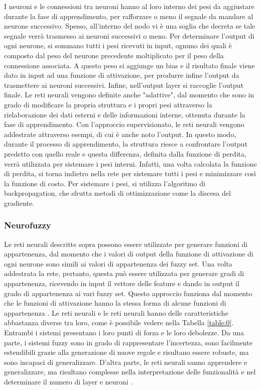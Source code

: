 \documentclass[11pt]{article}
\begin{document}
I neuroni e le connessioni tra neuroni hanno al loro interno dei pesi da aggiustare durante la fase di apprendimento, per rafforzare o meno il segnale da mandare al neurone successivo. Spesso, all'interno del nodo vi è una soglia che decreta se tale segnale verrà trasmesso ai neuroni successivi o meno. Per determinare l'output di ogni neurone, si sommano tutti i pesi ricevuti in input, ognuno dei quali è composto dal peso del neurone precedente moltiplicato per il peso della connessione associata. A questo peso si aggiunge un bias e il risultato finale viene dato in input ad una funzione di attivazione, per produrre infine l'output da trasmettere ai neuroni successivi. Infine, nell'output layer si raccoglie l'output finale. 
Le reti neurali vengono definite anche "adattive", dal momento che sono in grado di modificare la propria struttura e i propri pesi attraverso la rielaborazione dei dati esterni e delle informazioni interne, ottenuta durante la fase di apprendimento. Con l'approccio supervisionato, le reti neurali vengono addestrate attraverso esempi, di cui è anche noto l'output. In questo modo, durante il processo di apprendimento, la struttura riesce a confrontare l'output predetto con quello reale e questa differenza, definita dalla funzione di perdita, verrà utilizzata per sistemare i pesi interni. Infatti, una volta calcolata la funzione di perdita, si torna indietro nella rete per sistemare tutti i pesi e minimizzare così la funzione di costo. Per sistemare i pesi, si utilizza l'algoritmo di backpropagation, che sfrutta metodi di ottimizzazione come la discesa del gradiente. 



\subsubsection{Neurofuzzy}
Le reti neurali descritte sopra possono essere utilizzate per generare funzioni di appartenenza, dal momento che i valori di output della funzione di attivazione di ogni neurone sono simili ai valori di appartenenza dei fuzzy set. Una volta addestrata la rete, pertanto, questa può essere utilizzata per generare gradi di appartenenza, ricevendo in input il vettore delle feature e dando in output il grado di appartenenza ai vari fuzzy set. Questo approccio funziona dal momento che le funzioni di attivazione hanno la stessa forma di
alcune funzioni di appartenenza \cite{membneuralnetwsimilar}. Le reti neurali e le reti neurali hanno delle caratteristiche abbastanza diverse tra loro, come è possibile vedere nella Tabella \ref{table:0}\cite{neurofuzzyintro}. Entrambi i sistemi presentano i loro punti di forza e le loro debolezze. Da una parte, i sistemi fuzzy sono in grado di rappresentare l'incertezza, sono facilmente estendibili grazie alla generazione di nuove regole e risultano essere robuste, ma sono incapaci di generalizzare. D'altra parte, le reti neurali sanno apprendere e generalizzare, ma risultano complesse nella interpretazione delle funzionalità e nel determinare il numero di layer e neuroni \cite{surveyneurofuzzy}.
\end{document}
